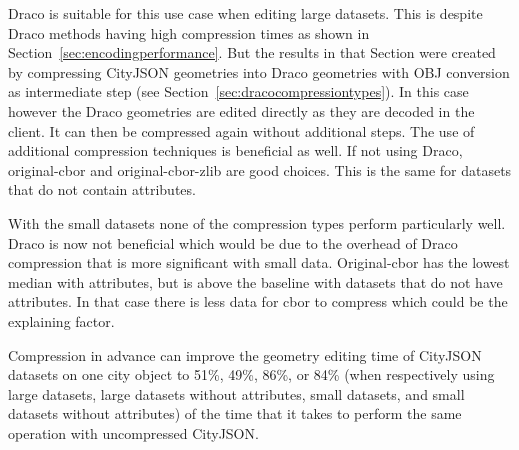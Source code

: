 Draco is suitable for this use case when editing large datasets.
This is despite Draco methods having high compression times as shown in Section~\ref{sec:encodingperformance}.
But the results in that Section were created by compressing CityJSON geometries into Draco geometries with OBJ conversion as intermediate step (see Section~\ref{sec:dracocompressiontypes}).
In this case however the Draco geometries are edited directly as they are decoded in the client.
It can then be compressed again without additional steps.
The use of additional compression techniques is beneficial as well.
If not using Draco, original-cbor and original-cbor-zlib are good choices.
This is the same for datasets that do not contain attributes.

With the small datasets none of the compression types perform particularly well.
Draco is now not beneficial which would be due to the overhead of Draco compression that is more significant with small data.
Original-cbor has the lowest median with attributes, but is above the baseline with datasets that do not have attributes.
In that case there is less data for \ac{cbor} to compress which could be the explaining factor.

Compression in advance can improve the geometry editing time of CityJSON datasets on one city object to 51\%, 49\%, 86\%, or 84\% (when respectively using large datasets, large datasets without attributes, small datasets, and small datasets without attributes) of the time that it takes to perform the same operation with uncompressed CityJSON.



